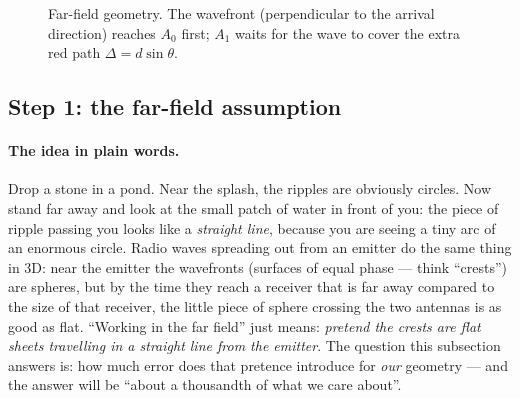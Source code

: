 \begin{figure}[ht]
\centering
{}
\caption{Far-field geometry. The wavefront (perpendicular to the arrival
direction) reaches $A_0$ first; $A_1$ waits for the wave to cover the extra
red path $\Delta = d\sin\theta$.}
\label{fig:geometry}
\end{figure}

\subsection{Step 1: the far-field assumption}
\label{sec:farfield}

\paragraph{The idea in plain words.}
Drop a stone in a pond. Near the splash, the ripples are obviously circles.
Now stand far away and look at the small patch of water in front of you: the
piece of ripple passing you looks like a \emph{straight line}, because you are
seeing a tiny arc of an enormous circle. Radio waves spreading out from an
emitter do the same thing in 3D: near the emitter the wavefronts (surfaces of
equal phase --- think ``crests'') are spheres, but by the time they reach a
receiver that is far away compared to the size of that receiver, the little
piece of sphere crossing the two antennas is as good as flat. ``Working in the
far field'' just means: \emph{pretend the crests are flat sheets travelling in
a straight line from the emitter}. The question this subsection answers is:
how much error does that pretence introduce for \emph{our} geometry --- and
the answer will be ``about a thousandth of what we care about''.

